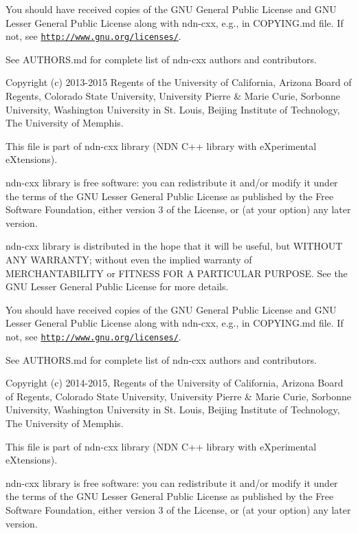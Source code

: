 You should have received copies of the G\+NU General Public License and G\+NU Lesser General Public License along with ndn-\/cxx, e.\+g., in C\+O\+P\+Y\+I\+N\+G.\+md file. If not, see \href{http://www.gnu.org/licenses/}{\tt http\+://www.\+gnu.\+org/licenses/}.

See A\+U\+T\+H\+O\+R\+S.\+md for complete list of ndn-\/cxx authors and contributors.

Copyright (c) 2013-\/2015 Regents of the University of California, Arizona Board of Regents, Colorado State University, University Pierre \& Marie Curie, Sorbonne University, Washington University in St. Louis, Beijing Institute of Technology, The University of Memphis.

This file is part of ndn-\/cxx library (N\+DN C++ library with e\+Xperimental e\+Xtensions).

ndn-\/cxx library is free software\+: you can redistribute it and/or modify it under the terms of the G\+NU Lesser General Public License as published by the Free Software Foundation, either version 3 of the License, or (at your option) any later version.

ndn-\/cxx library is distributed in the hope that it will be useful, but W\+I\+T\+H\+O\+UT A\+NY W\+A\+R\+R\+A\+N\+TY; without even the implied warranty of M\+E\+R\+C\+H\+A\+N\+T\+A\+B\+I\+L\+I\+TY or F\+I\+T\+N\+E\+SS F\+OR A P\+A\+R\+T\+I\+C\+U\+L\+AR P\+U\+R\+P\+O\+SE. See the G\+NU Lesser General Public License for more details.

You should have received copies of the G\+NU General Public License and G\+NU Lesser General Public License along with ndn-\/cxx, e.\+g., in C\+O\+P\+Y\+I\+N\+G.\+md file. If not, see \href{http://www.gnu.org/licenses/}{\tt http\+://www.\+gnu.\+org/licenses/}.

See A\+U\+T\+H\+O\+R\+S.\+md for complete list of ndn-\/cxx authors and contributors.

Copyright (c) 2014-\/2015, Regents of the University of California, Arizona Board of Regents, Colorado State University, University Pierre \& Marie Curie, Sorbonne University, Washington University in St. Louis, Beijing Institute of Technology, The University of Memphis.

This file is part of ndn-\/cxx library (N\+DN C++ library with e\+Xperimental e\+Xtensions).

ndn-\/cxx library is free software\+: you can redistribute it and/or modify it under the terms of the G\+NU Lesser General Public License as published by the Free Software Foundation, either version 3 of the License, or (at your option) any later version.

